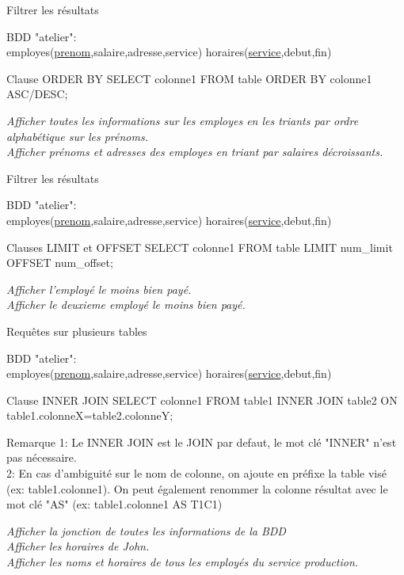 \documentclass[xetex,dvipsnames]{beamer}
\begin{document}
\begin{frame}[t]{Filtrer les résultats}
\begin{small}
		BDD "atelier": \\employes(\underline{prenom},salaire,adresse,service) horaires(\underline{service},debut,fin)
\end{small}	
	\begin{alertblock}{Clause ORDER BY}
		SELECT colonne1 FROM table ORDER BY colonne1 ASC/DESC;
	\end{alertblock}
	
		\textit{Afficher toutes les informations sur les employes en les triants par ordre alphabétique sur les prénoms.}\\
		\textit{Afficher prénoms et adresses des employes en triant par salaires décroissants.}\\
\end{frame}


\begin{frame}[t]{Filtrer les résultats}
\begin{small}
		BDD "atelier": \\employes(\underline{prenom},salaire,adresse,service) horaires(\underline{service},debut,fin)
\end{small}	
	\begin{alertblock}{Clauses LIMIT et OFFSET}
		SELECT colonne1 FROM table LIMIT num\_limit OFFSET num\_offset;
	\end{alertblock}
		\textit{Afficher l'employé le moins bien payé.}\\
		\textit{Afficher le deuxieme employé le moins bien payé.}\\
\end{frame}

\begin{frame}[t]{Requêtes sur plusieurs tables}
\begin{small}
		BDD "atelier": \\employes(\underline{prenom},salaire,adresse,service) horaires(\underline{service},debut,fin)
\end{small}	
	\begin{alertblock}{Clause INNER JOIN}
		SELECT colonne1 FROM table1 INNER JOIN table2 ON table1.colonneX=table2.colonneY;
	\end{alertblock}
\begin{footnotesize}
	\begin{block}{Remarque}
	 1: Le INNER JOIN est le JOIN par defaut, le mot clé "INNER" n'est pas nécessaire.
	\\2: En cas d'ambiguité sur le nom de colonne, on ajoute en préfixe la table visé (ex: table1.colonne1). On peut également renommer la colonne résultat avec le mot clé "AS" (ex: table1.colonne1 AS T1C1)
	\end{block}
\end{footnotesize}
		
		\textit{Afficher la jonction de toutes les informations de la BDD}\\
		\textit{Afficher les horaires de John.}\\
		\textit{Afficher les noms et horaires de tous les employés du service production.}\\
\end{frame}
\end{document}
